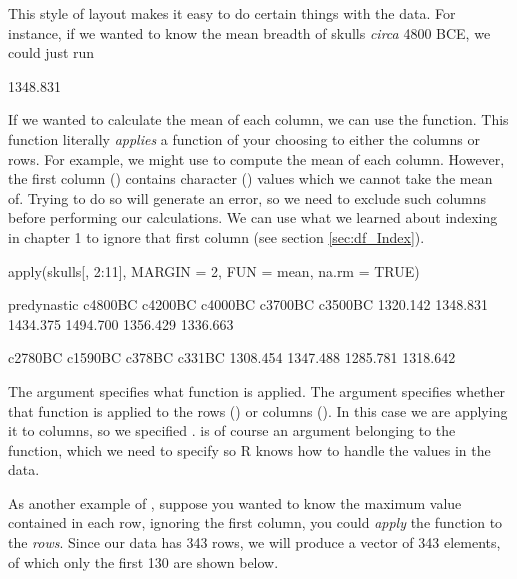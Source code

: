 This style of layout makes it easy to do certain things with the data. For instance, if we wanted to know the mean breadth of skulls \textit{circa} 4800 BCE, we could just run 


\begin{outR}
[1] 1348.831
\end{outR}

If we wanted to calculate the mean of each column, we can use the  function. This function literally \textit{applies} a function of your choosing to either the columns or rows. For example, we might use  to compute the mean of each column. However, the first column () contains character () values which we cannot take the mean of. Trying to do so will generate an error, so we need to exclude such columns before performing our calculations. We can use what we learned about indexing in chapter 1 to ignore that first column (see section \ref{sec:df_Index}).

\begin{inR}
apply(skulls[, 2:11], MARGIN = 2, FUN = mean, na.rm = TRUE)
\end{inR}

\begin{outR}
predynastic     c4800BC     c4200BC     c4000BC     c3700BC     c3500BC 
   1320.142    1348.831    1434.375    1494.700    1356.429    1336.663 
   
    c2780BC     c1590BC      c378BC      c331BC 
   1308.454    1347.488    1285.781    1318.642 
\end{outR}

\noindent
The argument  specifies what function is applied. The argument  specifies whether that function is applied to the rows () or columns (). In this case we are applying it to columns, so we specified .  is of course an argument belonging to the  function, which we need to specify so R knows how to handle the  values in the data.

As another example of , suppose you wanted to know the maximum value contained in each row, ignoring the first column, you could \textit{apply} the function  to the \textit{rows}. Since our data has 343 rows, we will produce a vector of 343 elements, of which only the first 130 are shown below.

